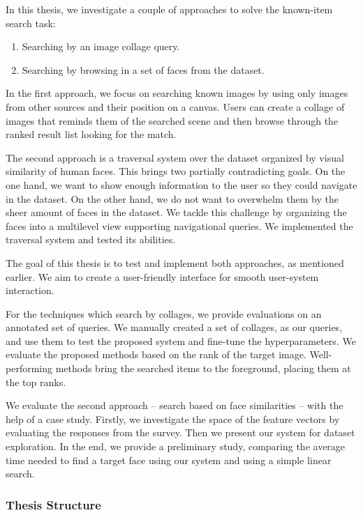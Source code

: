In this thesis, we investigate a couple of approaches to solve the known-item search task:

\begin{enumerate}
  \item Searching by an image collage query.
  \item Searching by browsing in a set of faces from the dataset.
\end{enumerate}

In the first approach, we focus on searching known images by using only images from other sources and their position on a canvas. Users can create a collage of images that reminds them of the searched scene and then browse through the ranked result list looking for the match.

The second approach is a traversal system over the dataset organized by visual similarity of human faces. This brings two partially contradicting goals. On the one hand, we want to show enough information to the user so they could navigate in the dataset. On the other hand, we do not want to overwhelm them by the sheer amount of faces in the dataset. We tackle this challenge by organizing the faces into a multilevel view supporting navigational queries. We implemented the traversal system and tested its abilities.

The goal of this thesis is to test and implement both approaches, as mentioned earlier. We aim to create a user-friendly interface for smooth user-system interaction.

For the techniques which search by collages, we provide evaluations on an annotated set of queries. We manually created a set of collages, as our queries, and use them to test the proposed system and fine-tune the hyperparameters. We evaluate the proposed methods based on the rank of the target image. Well-performing methods bring the searched items to the foreground, placing them at the top ranks.

We evaluate the second approach -- search based on face similarities -- with the help of a case study. Firstly, we investigate the space of the feature vectors by evaluating the responses from the survey. Then we present our system for dataset exploration. In the end, we provide a preliminary study, comparing the average time needed to find a target face using our system and using a simple linear search.

\subsubsection*{Thesis Structure}

